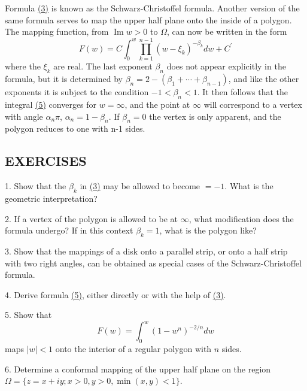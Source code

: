 Formula \hyperref[eq:6.3]{(3)} is known as the Schwarz-Christoffel formula. Another version of the same formula serves to map the upper half plane onto the inside of a polygon. The mapping function, from $\operatorname{Im} w > 0$ to $\Omega$, can now be written in the form
\begin{equation*}
F (w) = C \int_ {0} ^ {w} \prod_ {k = 1} ^ {n - 1} (w - \xi_ {k}) ^ {- \beta_ {k}} d w + C ^ {\prime}\tag{5}\label{eq:6.5}
\end{equation*}
where the $\xi_{k}$ are real. The last exponent $\beta_{n}$ does not appear explicitly in the formula, but it is determined by $\beta_{n}=2-(\beta_{1}+\cdots+\beta_{n-1})$, and like the other exponents it is subject to the condition $-1<\beta_{n}<1$. It then follows that the integral \hyperref[eq:6.5]{(5)} converges for $w=\infty$, and the point at $\infty$ will correspond to a vertex with angle $\alpha_{n}\pi$, $\alpha_{n}=1-\beta_{n}$. If $\beta_{n}=0$ the vertex is only apparent, and the polygon reduces to one with n-1 sides.

\subsection*{EXERCISES}
1. Show that the $\beta_{k}$ in \hyperref[eq:6.3]{(3)} may be allowed to become $= -1$. What is the geometric interpretation?

2. If a vertex of the polygon is allowed to be at $\infty$, what modification does the formula undergo? If in this context $\beta_{k}=1$, what is the polygon like?

3. Show that the mappings of a disk onto a parallel strip, or onto a half strip with two right angles, can be obtained as special cases of the Schwarz-Christoffel formula.

4. Derive formula \hyperref[eq:6.5]{(5)}, either directly or with the help of \hyperref[eq:6.3]{(3)}.

5. Show that
\begin{equation*}
F (w) = \int_ {0} ^ {w} (1 - w ^ {n}) ^ {- 2 / n} d w
\end{equation*}
maps $|w| < 1$ onto the interior of a regular polygon with $n$ sides.

6. Determine a conformal mapping of the upper half plane on the region $\Omega = \{z = x + iy; x > 0, y > 0, \min(x, y) < 1\}$.

